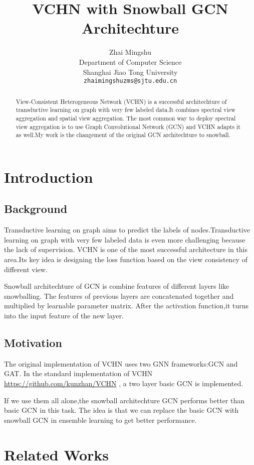 \documentclass{article}
\title{VCHN with Snowball GCN Architechture}
\author{
  Zhai Mingshu \\
  Department of Computer Science\\
  Shanghai Jiao Tong University\\ %
  \texttt{zhaimingshuzms@sjtu.edu.cn} \\
}
\begin{document}
\maketitle


\begin{abstract}
    View-Consistent Heterogeneous Network (VCHN) is a successful architechture of transductive learning on graph with
    very few labeled data.It combines spectral view aggregation and spatial view aggregation.
    The most common way to deploy spectral view aggregation is to use Graph Convolutional Network (GCN) and 
    VCHN adapts it as well.My work is the changement of the original GCN architechture to snowball.
\end{abstract}


\section{Introduction}




\subsection{Background}
Transductive learning on graph aims to predict the labels of nodes.Transductive learning on graph with
very few labeled data is even more challenging because the lack of supervision.
VCHN \cite{VCHN} is one of the most successful architecture in this area.Its key idea is 
designing the loss function based on the view consistency of different view.


Snowball architechture of GCN is combine features of different layers like snowballing.
The features of previous layers are concatenated together and multiplied by learnable parameter matrix.
After the activation function,it turns into the input feature of the new layer.
\subsection{Motivation}
The original implementation of VCHN uses two GNN frameworks:GCN and GAT.
In the standard implementation of VCHN \url{https://github.com/kunzhan/VCHN} ,
a two layer basic GCN is implemented.


If we use them all alone,the snowball architechture GCN performs better than basic GCN in this task.
The idea is that we can replace the basic GCN with snowball GCN in ensemble learning to get better performance.

\section{Related Works}
\end{document}
